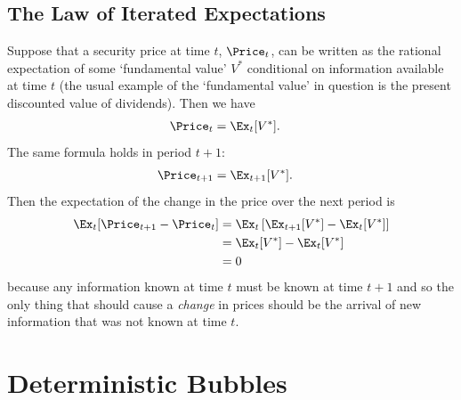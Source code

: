 \documentclass{handout}
\begin{document}
\subsection{The Law of Iterated Expectations}
Suppose that a security price at time $t$, $\Price_{t}$, can be written as 
the rational expectation of some `fundamental value' $V^{*}$ 
conditional on information available at time $t$ (the usual example of 
the `fundamental value' in question is the present discounted value of 
dividends).  Then we have
\begin{equation}\begin{gathered}\begin{aligned}
        \Price_{t} & =  \Ex_{t}[V^{*}].  
\end{aligned}\end{gathered}\end{equation}
The same formula holds in period $t+1$:
\begin{equation}\begin{gathered}\begin{aligned}
        \Price_{t+1} & =  \Ex_{t+1}[V^{*}]. 
\end{aligned}\end{gathered}\end{equation}
Then the expectation of the change in the price over the next
period is
\begin{equation}\begin{gathered}\begin{aligned}
        \Ex_{t}[\Price_{t+1}-\Price_{t}] & =  \Ex_{t}\left[\Ex_{t+1}[V^{*}]-\Ex_{t}[V^{*}]\right]  \\
         & =  \Ex_{t}[V^{*}]-\Ex_{t}[V^{*}] \\
         & =  0
\end{aligned}\end{gathered}\end{equation}
because any information known at time $t$ must be known at time $t+1$ and
so the only thing that should cause a {\it change} in prices should be
the arrival of new information that was not known at time $t$.


\section{Deterministic Bubbles}
\end{document}

